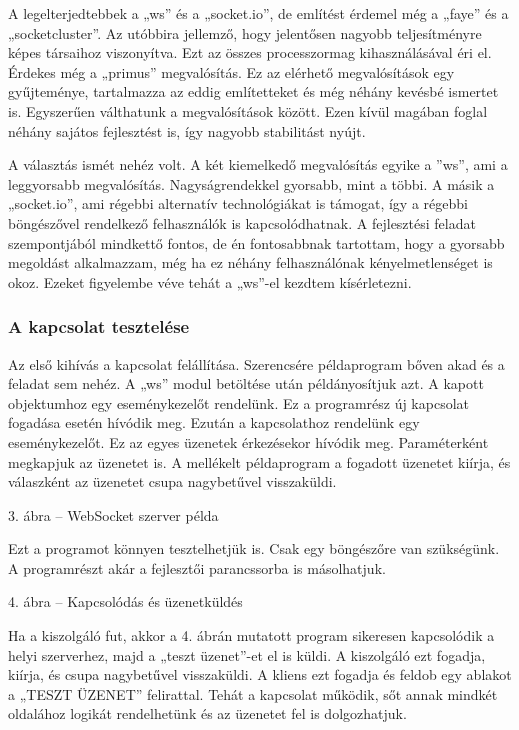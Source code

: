 \documentclass[bibliography=totocnumbered]{article}
\begin{document}
A legelterjedtebbek a „ws'' és a „socket.io'', de említést érdemel még a
„faye'' és a „socketcluster''. Az utóbbira jellemző, hogy jelentősen
nagyobb teljesítményre képes társaihoz viszonyítva. Ezt az összes
processzormag kihasználásával éri el. Érdekes még a „primus''
megvalósítás. Ez az elérhető megvalósítások egy gyűjteménye, tartalmazza
az eddig említetteket és még néhány kevésbé ismertet is. Egyszerűen
válthatunk a megvalósítások között. Ezen kívül magában foglal néhány
sajátos fejlesztést is, így nagyobb stabilitást nyújt.

A választás ismét nehéz volt. A két kiemelkedő megvalósítás egyike a
''ws'', ami a leggyorsabb megvalósítás. Nagyságrendekkel gyorsabb, mint
a többi. A másik a „socket.io'', ami régebbi alternatív technológiákat
is támogat, így a régebbi böngészővel rendelkező felhasználók is
kapcsolódhatnak. A fejlesztési feladat szempontjából mindkettő fontos,
de én fontosabbnak tartottam, hogy a gyorsabb megoldást alkalmazzam, még
ha ez néhány felhasználónak kényelmetlenséget is okoz. Ezeket figyelembe
véve tehát a „ws''-el kezdtem kísérletezni.


\subsubsection{A kapcsolat tesztelése}

Az első kihívás a kapcsolat felállítása. Szerencsére példaprogram bőven
akad és a feladat sem nehéz. A „ws'' modul betöltése után példányosítjuk
azt. A kapott objektumhoz egy eseménykezelőt rendelünk. Ez a programrész
új kapcsolat fogadása esetén hívódik meg. Ezután a kapcsolathoz
rendelünk egy eseménykezelőt. Ez az egyes üzenetek érkezésekor hívódik
meg. Paraméterként megkapjuk az üzenetet is. A mellékelt példaprogram a
fogadott üzenetet kiírja, és válaszként az üzenetet csupa nagybetűvel
visszaküldi.

3. ábra -- WebSocket szerver példa

Ezt a programot könnyen tesztelhetjük is. Csak egy böngészőre van
szükségünk. A programrészt akár a fejlesztői parancssorba is
másolhatjuk.

4. ábra -- Kapcsolódás és üzenetküldés

Ha a kiszolgáló fut, akkor a 4. ábrán mutatott program sikeresen
kapcsolódik a helyi szerverhez, majd a „teszt üzenet''-et el is küldi. A
kiszolgáló ezt fogadja, kiírja, és csupa nagybetűvel visszaküldi. A
kliens ezt fogadja és feldob egy ablakot a „TESZT ÜZENET'' felirattal.
Tehát a kapcsolat működik, sőt annak mindkét oldalához logikát
rendelhetünk és az üzenetet fel is dolgozhatjuk.
\end{document}
